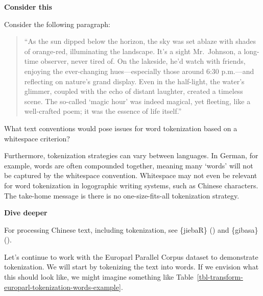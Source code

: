 \documentclass[
  letterpaper,
  krantz1]{latex/krantz-mod}
\theoremstyle{definition}
\theoremstyle{definition}
\theoremstyle{remark}
\begin{document}
\begin{tcolorbox}[enhanced jigsaw, toprule=.15mm, breakable, colback=white, arc=.35mm, left=2mm, colframe=quarto-callout-color-frame, opacityback=0, bottomrule=.15mm, rightrule=.15mm, leftrule=.75mm]

\textbf{ Consider this}

Consider the following paragraph:

\begin{quote}
``As the sun dipped below the horizon, the sky was set ablaze with
shades of orange-red, illuminating the landscape. It's a sight
Mr.~Johnson, a long-time observer, never tired of. On the lakeside, he'd
watch with friends, enjoying the ever-changing hues---especially those
around 6:30 p.m.---and reflecting on nature's grand display. Even in the
half-light, the water's glimmer, coupled with the echo of distant
laughter, created a timeless scene. The so-called `magic hour' was
indeed magical, yet fleeting, like a well-crafted poem; it was the
essence of life itself.''
\end{quote}

What text conventions would pose issues for word tokenization based on a
whitespace criterion?

\end{tcolorbox}

Furthermore, tokenization strategies can vary between languages. In
German, for example, words are often compounded together, meaning many
`words' will not be captured by the whitespace convention. Whitespace
may not even be relevant for word tokenization in logographic writing
systems, such as Chinese characters. The take-home message is there is
no one-size-fits-all tokenization strategy.

\begin{tcolorbox}[enhanced jigsaw, toprule=.15mm, breakable, colback=white, arc=.35mm, left=2mm, colframe=quarto-callout-color-frame, opacityback=0, bottomrule=.15mm, rightrule=.15mm, leftrule=.75mm]

\textbf{ Dive deeper}

For processing Chinese text, including tokenization, see \{jiebaR\}
() and \{gibasa\}
().

\end{tcolorbox}

Let's continue to work with the Europarl Parallel
Corpus dataset to demonstrate
tokenization. We will start by tokenizing the text into words. If we
envision what this should look like, we might imagine something like
Table~\ref{tbl-transform-europarl-tokenization-words-example}.
\end{document}
